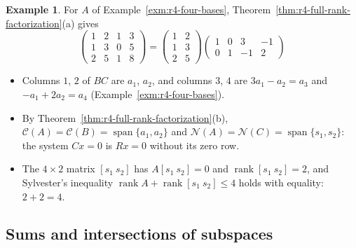 \documentclass[12pt]{article}
\DeclareMathOperator{\rank}{rank}
\DeclareMathOperator{\Span}{span}
\theoremstyle{definition}
\newtheorem{example}[theorem]{Example}
\begin{document}
\begin{example}\label{exm:r4-factorization}
For \(A\) of Example~\ref{exm:r4-four-bases}, Theorem~\ref{thm:r4-full-rank-factorization}(a) gives
\[
\begin{pmatrix}1&2&1&3\\1&3&0&5\\2&5&1&8\end{pmatrix}
=\begin{pmatrix}1&2\\1&3\\2&5\end{pmatrix}\begin{pmatrix}1&0&3&-1\\0&1&-1&2\end{pmatrix}
\]
\begin{itemize}
\item Columns \(1\), \(2\) of \(BC\) are \(a_1\), \(a_2\), and columns \(3\), \(4\) are
\(3a_1-a_2=a_3\) and \(-a_1+2a_2=a_4\) (Example~\ref{exm:r4-four-bases}).
\item By Theorem~\ref{thm:r4-full-rank-factorization}(b),
\(\mathcal C(A)=\mathcal C(B)=\Span\{a_1,a_2\}\) and
\(\mathcal N(A)=\mathcal N(C)=\Span\{s_1,s_2\}\): the system \(Cx=0\) is \(Rx=0\) without its zero
row.
\item The \(4\times2\) matrix \([s_1\ s_2]\) has \(A[s_1\ s_2]=0\) and \(\rank[s_1\ s_2]=2\), and Sylvester's
inequality \(\rank A+\rank[s_1\ s_2]\leqslant4\) holds with equality: \(2+2=4\).
\end{itemize}
\end{example}

\subsection*{Sums and intersections of subspaces}
\end{document}
